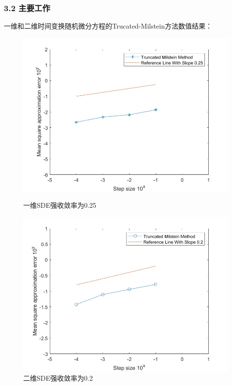\documentclass[notheorems,10pt,compress]{beamer}
\numberwithin{figure}{section}
\numberwithin{table}{section}
\numberwithin{equation}{section}
\numberwithin{theorem}{section}
\numberwithin{definition}{section}
\numberwithin{lemma}{section}
\numberwithin{proposition}{section}
\numberwithin{corollary}{section}
\theoremstyle{example}
\begin{document}
    
\begin{frame}		
    \frametitle{ 3.2 主要工作}
         一维和二维时间变换随机微分方程的Trucated-Milstein方法数值结果：

\begin{figure}[!htp]
    \begin{minipage}[h]{0.48\linewidth}
        \centering
        \includegraphics[width=0.9\linewidth]{image1}
        \caption{一维SDE强收敛率为0.25}
        \label{image1}
    \end{minipage}
    \begin{minipage}[h]{0.48\linewidth}
        \centering
        \includegraphics[width=0.9\linewidth]{image2}%
        \caption{二维SDE强收敛率为0.2}
        \label{image2}
    \end{minipage}
\end{figure}
\end{frame}
\end{document}
